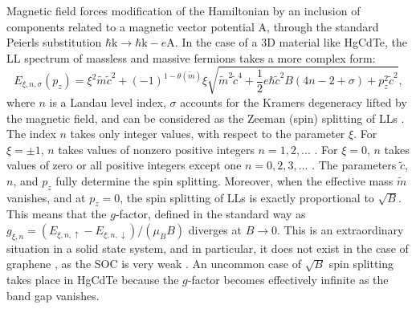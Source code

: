 \documentclass[titlepage,a4paper]{book}
\begin{document}
Magnetic field forces modification of the Hamiltonian by an inclusion of components related to a magnetic vector potential $\boldsymbol{\mathrm{A}}$, through the standard Peierls substitution $\hbar \boldsymbol{\mathrm{k}} \rightarrow \hbar\boldsymbol{\mathrm{k}} - e \boldsymbol{\mathrm{A}}$. In the case of a 3D material like HgCdTe, the LL spectrum of massless and massive fermions takes a more complex form:
\begin{equation}
\label{Eq:MCT_LLs}
E_{\xi,n,\sigma }(p_z) = \xi^2 \tilde{m}\tilde{c}^2 + (-1)^{1-\theta (\tilde{m})} \xi \sqrt{\tilde{m}^2\tilde{c}^4 + \frac{1}{2}e\hbar\tilde{c}^2B (4n - 2 + \sigma) + p_z^2\tilde{c}^2},
\end{equation}
where $n$ is a Landau level index, $\sigma$ accounts for the Kramers degeneracy lifted by the magnetic field, and can be considered as the Zeeman (spin) splitting of LLs \cite{Teppe_MCT}. The index $n$ takes only integer values, with respect to the parameter $\xi$. For $\xi = \pm 1$, $n$ takes values of nonzero positive integers $n = 1,2,...$ . For $\xi = 0$, $n$ takes values of zero or all positive integers except one $n = 0,2,3,...$ . The parameters $\tilde{c}$, $n$, and $p_z$ fully determine the spin splitting. Moreover, when the effective mass $\tilde{m}$ vanishes, and at $p_z = 0$, the spin splitting of LLs is exactly proportional to $\sqrt{B}$. This means that the $g$-factor, defined in the standard way as $g_{\xi , n} = (E_{\xi , n , \uparrow} - E_{\xi , n , \downarrow})/(\mu_B B)$ diverges at $B \rightarrow 0$. This is an extraordinary situation in a solid state system, and in particular, it does not exist in the case of graphene \cite{Orlita_MCT}, as the SOC is very weak \cite{Min_Topology}. An uncommon case of $\sqrt{B}$ spin splitting takes place in HgCdTe because the $g$-factor becomes effectively infinite as the band gap vanishes. 
\end{document}
